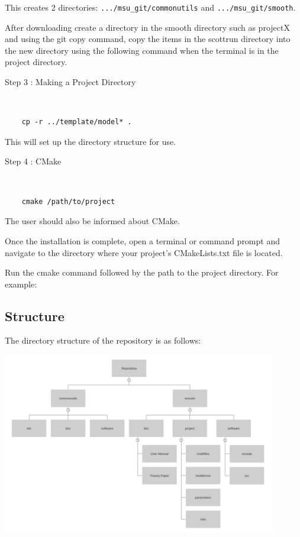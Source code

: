 \documentclass[12pt]{article}
\numberwithin{equation}{section}
\numberwithin{figure}{section}
\begin{document}
This creates 2 directories: {\tt .../msu\_git/commonutils} and {\tt .../msu\_git/smooth}.

After downloading create a directory in the smooth directory such as projectX and using the git copy command, copy the items in the scottrun directory into the new directory using the following command when the terminal is in the project directory.

\begin{description}
\item[Step 3 : Making a Project Directory] 
\end{description}
{\tt 
\begin{verbatim}
    cp -r ../template/model* . 
\end{verbatim}
}
     
This will set up the directory structure for use.  \\ 

\begin{description}
\item[Step 4 : CMake]
\end{description}

{\tt 
\begin{verbatim}
    cmake /path/to/project 
\end{verbatim}
}

The user should also be informed about CMake. 

Once the installation is complete, open a terminal or command prompt and navigate to the directory where your project's CMakeLists.txt file is located.

Run the cmake command followed by the path to the project directory. For example:


\subsection{Structure}

The directory structure of the repository is as follows: 

\includegraphics[width = 120mm]{Structure_Tree.png}
\end{document}
